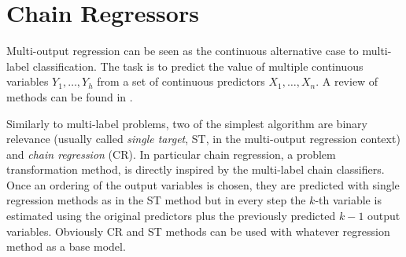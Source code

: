 \documentclass[11pt,a4paper, twoside]{book}
\begin{document}
%
 
\section{Chain Regressors}

Multi-output regression can be seen as the continuous alternative case to multi-label classification.
The task is to predict the value of multiple continuous variables $Y_1,\ldots,Y_h$ from a set of continuous predictors $X_1,\ldots,X_n$. 
A review of methods can be found in \cite{WIDM:WIDM1157}.

Similarly to multi-label problems, two of the simplest algorithm are binary relevance (usually called \textit{single target}, ST, in the multi-output regression context) and \textit{chain regression} (CR).
In particular chain regression, a problem transformation method, is directly inspired by the multi-label chain classifiers. Once an ordering of the output variables is chosen, they are predicted with single regression methods as in the ST method but in every step the $k$-th variable is estimated using the original predictors plus the previously predicted $k-1$ output variables.
Obviously CR and ST methods can be used with whatever regression method as a base model.
\end{document}
